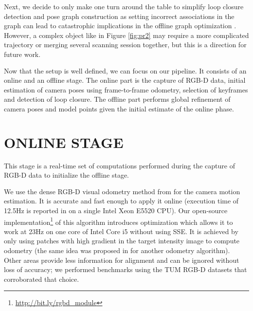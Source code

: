 \documentclass[letterpaper, 10 pt, conference]{ieeeconf}  %
\begin{document}

Next, we decide to only make one turn around the table to simplify loop closure detection and pose graph construction as
setting incorrect associations
in the graph can lead to catastrophic implications in the offline graph
optimization \cite{sunderhauf2012switchable}.
However, a complex object like in Figure \ref{fig:pr2} may require a more complicated trajectory
or merging several scanning session together, %
but this is a direction for future work.

Now that the setup is well defined, we can focus on our pipeline. It consists of an online and an 
offline stage. The online part is the capture of RGB-D data,
initial estimation of camera poses using frame-to-frame odometry,
selection of keyframes and detection of loop closure. The offline part performs
global refinement of camera poses and model points given the initial estimate of the online phase.

\section{ONLINE STAGE}

\label{sec:online}

This stage is a real-time set of computations performed during the capture of RGB-D data to initialize 
the offline stage.

We use the dense RGB-D visual odometry
method from \cite{steinbrucker2011real} for the camera motion estimation.
It is accurate and fast enough to apply it online
(execution time of 12.5Hz is reported in \cite{steinbrucker2011real}
on a single Intel Xeon E5520 CPU).
Our open-source implementation\footnote{\label{note1}\href{http://bit.ly/rgbd\_module}{http://bit.ly/rgbd\_module}} of this algorithm
introduces optimization which allows it to work at 23Hz on one core
of Intel Core i5 without using SSE.
It is achieved by only using patches with high gradient in the target intensity image
to compute odometry (the same idea was proposed in \cite{tykkala2011direct} for another odometry algorithm).
Other areas provide less information for alignment
and can be ignored without loss of accuracy; we performed benchmarks 
using the TUM RGB-D datasets \cite{sturm12iros} that corroborated that choice.
\end{document}
